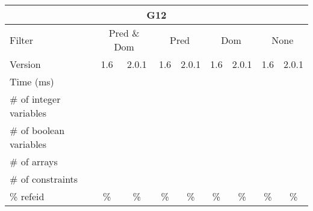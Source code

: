 \documentclass{standalone}
\begin{document}
\begin{tabular}{lc|c|c|c|c|c|c|c}
\multicolumn{9}{c}{G12} \\ 
\hline\hline Filter & \multicolumn{2}{c|}{Pred \& Dom} &\multicolumn{2}{c|}{Pred}  & \multicolumn{2}{c|}{Dom} & \multicolumn{2}{c}{None} \\ 
\hline Version & 1.6 & 2.0.1 & 1.6 & 2.0.1 & 1.6 & 2.0.1 & 1.6 & 2.0.1 \\ 
Time (ms)               &  &  &  &  &  &  &  &  \\ 
\# of integer variables &  &  &  &  &  &  &  &  \\ 
\# of boolean variables &  &  &  &  &  &  &  &  \\ 
\# of arrays            &  &  &  &  &  &  &  &  \\ 
\# of constraints       &  &  &  &  &  &  &  &  \\ 
\% refeid               & \% & \% & \% & \% & \% & \% & \% & \% \\ 
\end{tabular} 
\end{document}
